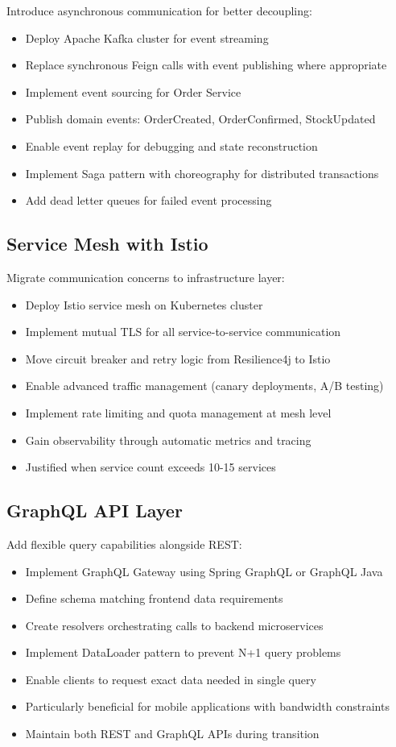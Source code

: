 Introduce asynchronous communication for better decoupling:
\begin{itemize}
    \item Deploy Apache Kafka cluster for event streaming
    \item Replace synchronous Feign calls with event publishing where appropriate
    \item Implement event sourcing for Order Service
    \item Publish domain events: OrderCreated, OrderConfirmed, StockUpdated
    \item Enable event replay for debugging and state reconstruction
    \item Implement Saga pattern with choreography for distributed transactions
    \item Add dead letter queues for failed event processing
\end{itemize}

\subsection{Service Mesh with Istio}

Migrate communication concerns to infrastructure layer:
\begin{itemize}
    \item Deploy Istio service mesh on Kubernetes cluster
    \item Implement mutual TLS for all service-to-service communication
    \item Move circuit breaker and retry logic from Resilience4j to Istio
    \item Enable advanced traffic management (canary deployments, A/B testing)
    \item Implement rate limiting and quota management at mesh level
    \item Gain observability through automatic metrics and tracing
    \item Justified when service count exceeds 10-15 services
\end{itemize}

\subsection{GraphQL API Layer}

Add flexible query capabilities alongside REST:
\begin{itemize}
    \item Implement GraphQL Gateway using Spring GraphQL or GraphQL Java
    \item Define schema matching frontend data requirements
    \item Create resolvers orchestrating calls to backend microservices
    \item Implement DataLoader pattern to prevent N+1 query problems
    \item Enable clients to request exact data needed in single query
    \item Particularly beneficial for mobile applications with bandwidth constraints
    \item Maintain both REST and GraphQL APIs during transition
\end{itemize}


